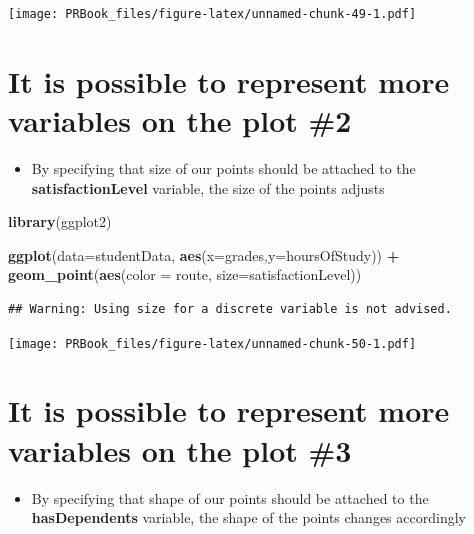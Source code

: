 \documentclass[
]{book}
\newenvironment{Shaded}{\begin{snugshade}}{\end{snugshade}}
\newcommand{\DataTypeTok}[1]{\textcolor[rgb]{0.13,0.29,0.53}{#1}}
\newcommand{\KeywordTok}[1]{\textcolor[rgb]{0.13,0.29,0.53}{\textbf{#1}}}
\newcommand{\NormalTok}[1]{#1}
\newcommand{\OperatorTok}[1]{\textcolor[rgb]{0.81,0.36,0.00}{\textbf{#1}}}
\newcommand{\StringTok}[1]{\textcolor[rgb]{0.31,0.60,0.02}{#1}}
\providecommand{\tightlist}{%
  \setlength{\itemsep}{0pt}\setlength{\parskip}{0pt}}
\begin{document}
\texttt{[image: PRBook\_files/figure-latex/unnamed-chunk-49-1.pdf]}

\hypertarget{it-is-possible-to-represent-more-variables-on-the-plot-2}{%
\section{It is possible to represent more variables on the plot \#2}\label{it-is-possible-to-represent-more-variables-on-the-plot-2}}

\begin{itemize}
\tightlist
\item
  By specifying that size of our points should be attached to the \textbf{satisfactionLevel} variable, the size of the points adjusts
\end{itemize}

\begin{Shaded}
\begin{Highlighting}[]
\KeywordTok{library}\NormalTok{(ggplot2)}

\KeywordTok{ggplot}\NormalTok{(}\DataTypeTok{data=}\NormalTok{studentData, }\KeywordTok{aes}\NormalTok{(}\DataTypeTok{x=}\NormalTok{grades,}\DataTypeTok{y=}\NormalTok{hoursOfStudy)) }\OperatorTok{+}\StringTok{ }\KeywordTok{geom_point}\NormalTok{(}\KeywordTok{aes}\NormalTok{(}\DataTypeTok{color =}\NormalTok{ route, }\DataTypeTok{size=}\NormalTok{satisfactionLevel))}
\end{Highlighting}
\end{Shaded}

\begin{verbatim}
## Warning: Using size for a discrete variable is not advised.
\end{verbatim}

\texttt{[image: PRBook\_files/figure-latex/unnamed-chunk-50-1.pdf]}

\hypertarget{it-is-possible-to-represent-more-variables-on-the-plot-3}{%
\section{It is possible to represent more variables on the plot \#3}\label{it-is-possible-to-represent-more-variables-on-the-plot-3}}

\begin{itemize}
\tightlist
\item
  By specifying that shape of our points should be attached to the \textbf{hasDependents} variable, the shape of the points changes accordingly
\end{itemize}
\end{document}
